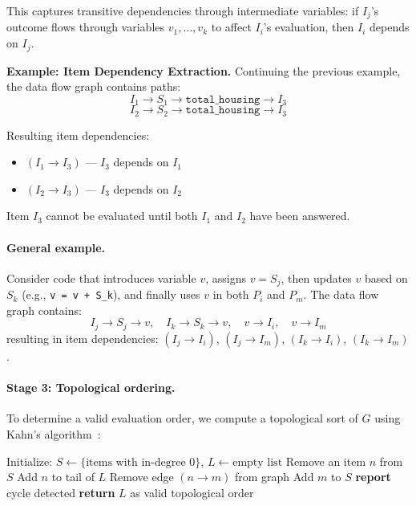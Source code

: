This captures transitive dependencies through intermediate variables: if $I_j$'s outcome flows through variables $v_1, \dots, v_k$ to affect $I_i$'s evaluation, then $I_i$ depends on $I_j$.

\begin{mdframed}
\noindent\textbf{Example: Item Dependency Extraction.} Continuing the previous example, the data flow graph contains paths:
\[
I_1 \to S_1 \to \texttt{total\_housing} \to I_3
\]
\[
I_2 \to S_2 \to \texttt{total\_housing} \to I_3
\]

Resulting item dependencies:
\begin{itemize}
    \item $(I_1 \to I_3)$ — $I_3$ depends on $I_1$
    \item $(I_2 \to I_3)$ — $I_3$ depends on $I_2$
\end{itemize}

Item $I_3$ cannot be evaluated until both $I_1$ and $I_2$ have been answered.
\end{mdframed}

\paragraph{General example.} Consider code that introduces variable $v$, assigns $v = S_j$, then updates $v$ based on $S_k$ (e.g., \texttt{v = v + S\_k}), and finally uses $v$ in both $P_i$ and $P_m$. The data flow graph contains:
\[
I_j \to S_j \to v, \quad I_k \to S_k \to v, \quad v \to I_i, \quad v \to I_m
\]
resulting in item dependencies: $(I_j \to I_i)$, $(I_j \to I_m)$, $(I_k \to I_i)$, $(I_k \to I_m)$.

\paragraph{Stage 3: Topological ordering.} To determine a valid evaluation order, we compute a topological sort of $G$ using Kahn's algorithm~\cite{cormen2009introduction}:

\begin{algorithm}[H]
\caption{Kahn's Algorithm for Topological Sorting}
\label{alg:kahn}
\begin{algorithmic}[1]
\State Initialize: $S \gets \{\text{items with in-degree } 0\}$, $L \gets \text{empty list}$
    \State Remove an item $n$ from $S$
    \State Add $n$ to tail of $L$
        \State Remove edge $(n \to m)$ from graph
            \State Add $m$ to $S$
        \EndIf
    \EndFor
\EndWhile
{}
    \State \textbf{report} cycle detected
\Else
    \State \textbf{return} $L$ as valid topological order
\EndIf
\end{algorithmic}
\end{algorithm}

